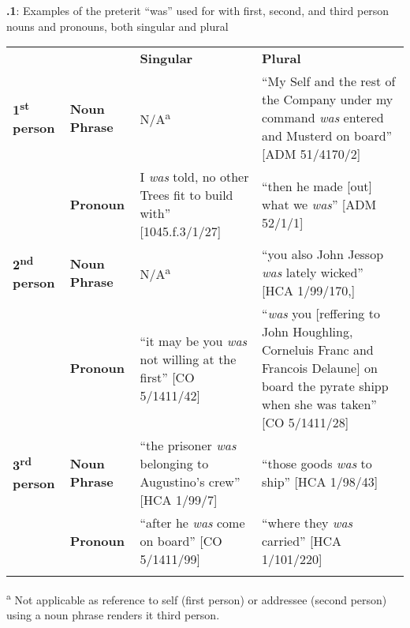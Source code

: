 \textbf{.1}: Examples of the preterit “was” used for with first, second, and third person nouns and pronouns, both singular and plural

\begin{tabularx}{\textwidth}{XXXX} &  & \textbf{Singular} & \textbf{Plural}\\
\lsptoprule
 \textbf{1\textsuperscript{st}} \textbf{person} & \textbf{Noun} \textbf{Phrase} & N/A\textsuperscript{a} & “My Self and the rest of the Company under my command \textit{was} entered and Musterd on board” [ADM 51/4170/2]\\
& \textbf{Pronoun} & I \textit{was} told, no other Trees fit to build with” [1045.f.3/1/27] & “then he made [out] what we \textit{was}” [ADM 52/1/1]\\
 \textbf{2\textsuperscript{nd}} \textbf{person} & \textbf{Noun} \textbf{Phrase} & N/A\textsuperscript{a} & “you also John Jessop \textit{was} lately wicked” [HCA 1/99/170,]\\
& \textbf{Pronoun} & “it may be you \textit{was} not willing at the first” [CO 5/1411/42] & “\textit{was} you [reffering to John Houghling, Corneluis Franc and Francois Delaune] on board the pyrate shipp when she was taken” [CO 5/1411/28] \\
 \textbf{3\textsuperscript{rd}} \textbf{person} & \textbf{Noun} \textbf{Phrase} & “the prisoner \textit{was} belonging to Augustino’s crew” [HCA 1/99/7] & “those goods \textit{was} to ship” [HCA 1/98/43] \\
& \textbf{Pronoun} & “after he \textit{was} come on board” [CO 5/1411/99] & “where they \textit{was} carried” [HCA 1/101/220]\\

\lspbottomrule
\end{tabularx}
\textsuperscript{a} Not applicable as reference to self (first person) or addressee (second person) using a noun phrase renders it third person. 

